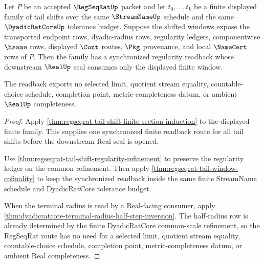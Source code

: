 \begin{theorem}
\label{thm:regseqrat-tail-shift-choice-free-window}
Let $P$ be an accepted $\RegSeqRatUp$ packet and let $t_0,\ldots,t_k$ be a finite displayed family of tail shifts over the same $\StreamNameUp$ schedule and the same $\DyadicRatCoreUp$ tolerance budget. Suppose the shifted windows expose the transported endpoint rows, dyadic-radius rows, regularity ledgers, componentwise $\hsame$ rows, displayed $\Cont$ routes, $\Pkg$ provenance, and local $\NameCert$ rows of $P$. Then the family has a synchronized regularity readback whose downstream $\RealUp$ seal consumes only the displayed finite window.

The readback exports no selected limit, quotient stream equality, countable-choice schedule, completion point, metric-completeness datum, or ambient $\RealUp$ completeness.
\end{theorem}
\begin{proof}
Apply \autoref{thm:regseqrat-tail-shift-finite-section-induction} to the displayed finite family. This supplies one synchronized finite readback route for all tail shifts before the downstream Real seal is opened.

Use \autoref{thm:regseqrat-tail-shift-regularity-refinement} to preserve the regularity ledger on the common refinement. Then apply \autoref{thm:regseqrat-tail-window-cofinality} to keep the synchronized readback inside the same finite StreamName schedule and DyadicRatCore tolerance budget.

When the terminal radius is read by a Real-facing consumer, apply \autoref{thm:dyadicratcore-terminal-radius-half-step-inversion}. The half-radius row is already determined by the finite DyadicRatCore common-scale refinement, so the RegSeqRat route has no need for a selected limit, quotient stream equality, countable-choice schedule, completion point, metric-completeness datum, or ambient Real completeness.
\end{proof}

